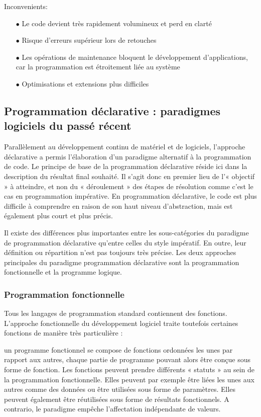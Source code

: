 \documentclass[a4paper,12pt]{article} %
\begin{document}
Inconvenients:
\begin{itemize}
\item[$\bullet$]Le code devient très rapidement volumineux et perd en clarté
\item[$\bullet$]Risque d’erreurs supérieur lors de retouches
\item[$\bullet$]Les opérations de maintenance bloquent le développement d’applications, car la programmation est étroitement liée au système
\item[$\bullet$]Optimisations et extensions plus difficiles
\end{itemize}


\subsection{Programmation déclarative : paradigmes logiciels du passé récent} %

Parallèlement au développement continu de matériel et de logiciels, l’approche déclarative a permis l’élaboration d’un paradigme alternatif à la programmation de code. Le principe de base de la programmation déclarative réside ici dans la description du résultat final souhaité. Il s’agit donc en premier lieu de l’« objectif » à atteindre, et non du « déroulement » des étapes de résolution comme c’est le cas en programmation impérative. En programmation déclarative, le code est plus difficile à comprendre en raison de son haut niveau d’abstraction, mais est également plus court et plus précis.

Il existe des différences plus importantes entre les sous-catégories du paradigme de programmation déclarative qu’entre celles du style impératif. En outre, leur définition ou répartition n’est pas toujours très précise. Les deux approches principales du paradigme programmation déclarative sont la programmation fonctionnelle et la programme logique.


\subsubsection{Programmation fonctionnelle}

Tous les langages de programmation standard contiennent des fonctions. L’approche fonctionnelle du développement logiciel traite toutefois certaines fonctions de manière très particulière :

un programme fonctionnel se compose de fonctions ordonnées les unes par rapport aux autres, chaque partie de programme pouvant alors être conçue sous forme de fonction. Les fonctions peuvent prendre différents « statuts » au sein de la programmation fonctionnelle. Elles peuvent par exemple être liées les unes aux autres comme des données ou être utilisées sous forme de paramètres. Elles peuvent également être réutilisées sous forme de résultats fonctionnels. A contrario, le paradigme empêche l’affectation indépendante de valeurs.
\end{document}
